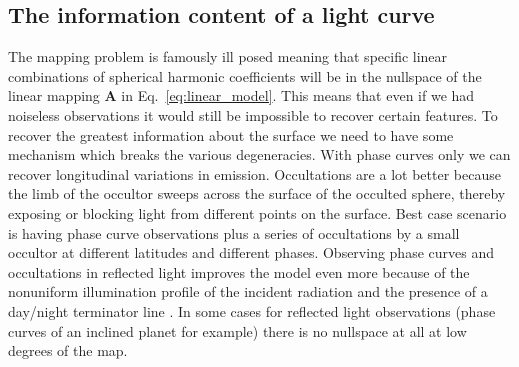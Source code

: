 \documentclass[modern]{aastex62}
\begin{document}
\subsection{The information content of a light curve}
\label{ssec:information_content}
The mapping problem is famously ill posed meaning that specific linear combinations of spherical harmonic coefficients will be in the nullspace of the linear mapping  $\mathbf{A}$ in Eq.~\ref{eq:linear_model}.
This means that even if we had noiseless observations it would still be impossible to recover certain features.
To recover the greatest information about the surface we need to have some mechanism which breaks the various degeneracies.
With phase curves only we can recover longitudinal variations in emission.
Occultations are a lot better because the limb of the occultor sweeps across the surface of the occulted sphere, thereby exposing or blocking light from different points on the surface.
Best case scenario is having phase curve observations plus a series of occultations by a small occultor at different latitudes and different phases.
Observing phase curves and occultations in reflected light improves the model even more because of the nonuniform illumination profile of the incident radiation and the presence of a day/night terminator line \citep[][Luger et al. 2020 in prep]{luger2019a}.
In some cases for reflected light observations (phase curves of an inclined planet for example) there is no nullspace at all at low degrees of the map.
\end{document}
